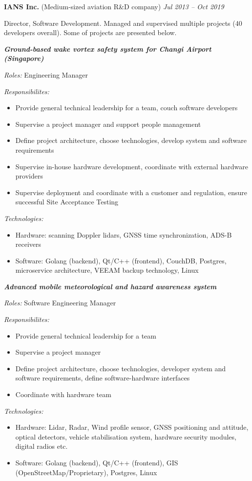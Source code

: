 \documentclass[a4paper]{article}
\newcommand{\project}[4]{

	\textbf{\textit{#1}}
    \vspace{2mm}

    \textit{Roles:} #2
    \vspace{2mm}

    \textit{Responsibilites:}
	\begin{itemize}
	    \setlength{\itemindent}{.5cm}
	    #3
    \end{itemize}
    
	\textit{Technologies:}
	\begin{itemize}
		\setlength{\itemindent}{.5cm}
		#4
	\end{itemize}
}
\begin{document}
    \vspace{3mm}
    \textbf{IANS Inc.} (Medium-sized aviation R\&D company) \hfill \textit{ Jul 2013 -- Oct 2019}

    \vspace{3mm}
	Director, Software Development. Managed and supervised multiple projects (40 developers overall). Some of projects are presented below.\\
    \vspace{2mm}

	\project{Ground-based wake vortex safety system for Changi Airport (Singapore)}{
		Engineering Manager
	}{
		\item Provide general technical leadership for a team, couch software developers
		\item Supervise a project manager and support people management
		\item Define project architecture, choose technologies, develop system and software requirements
		\item Supervise in-house hardware development, coordinate with external hardware providers
		\item Supervise deployment and coordinate with a customer and regulation, ensure successful Site Acceptance Testing
	}{
		\item Hardware: scanning Doppler lidars, GNSS time synchronization, ADS-B receivers
		\item Software: Golang (backend), Qt/C++ (frontend), CouchDB, Postgres, microservice architecture, VEEAM backup technology, Linux
	}
    \vspace{2mm}

	\project{Advanced mobile meteorological and hazard awareness system}{
		Software Engineering Manager
	}{
		\item Provide general technical leadership for a team
		\item Supervise a project manager
		\item Define project architecture, choose technologies, developer system and software requirements, define software-hardware interfaces
		\item Coordinate with hardware team
	}{
		\item Hardware: Lidar, Radar, Wind profile sensor, GNSS positioning and attitude, optical detectors, vehicle stabilisation system, hardware security modules, digital radios etc.
		\item Software: Golang (backend), Qt/C++ (frontend), GIS (OpenStreetMap/Proprietary), Postgres, Linux
	}
    \vspace{2mm}
\end{document}
